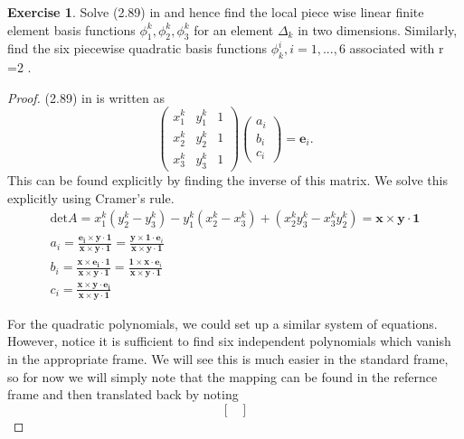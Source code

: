 \documentclass{amsart}
\theoremstyle{plain}
\theoremstyle{definition}
\newtheorem{exer}{Exercise}[section]
\begin{document}
\begin{exer}
    Solve (2.89) in \cite{lord2014introduction} and hence find the local piece wise linear finite element basis functions $\phi_1^k, \phi_2^k, \phi_3^k$ for an element $\Delta_k$ in two dimensions. Similarly, find the six piecewise quadratic basis functions $\phi_k^i, i = 1,...,6$ associated with r =2 .
\end{exer}
\begin{proof}
    (2.89) in \cite{lord2014introduction} is written as 
    $$\begin{pmatrix}
        x_1^k & y_1^k & 1 \\
        x_2^k & y_2^k & 1 \\
        x_3^k & y_3^k & 1
    \end{pmatrix}\begin{pmatrix}
        a_i\\
        b_i\\
        c_i
    \end{pmatrix} = \mathbf{e}_i.$$
    This can be found explicitly by finding the inverse of this matrix. We solve this explicitly using Cramer's rule. 
    \begin{gather*}
        \text{det}A = x_1^k\left(y_2^k - y_3^k\right)-y_1^k\left(x_2^k-x_3^k\right)+\left(x_2^k y_3^k - x_3^k y_2^k\right) = \mathbf{x}\times \mathbf{y}\cdot \mathbf{1}\\
        a_i = \frac{\mathbf{\mathbf{e}_i \times \mathbf{y}\cdot \mathbf{1}}}{\mathbf{x}\times \mathbf{y}\cdot \mathbf{1}} = \frac{\mathbf{\mathbf{y}\times \mathbf{1}} \cdot \mathbf{e}_i}{\mathbf{x}\times \mathbf{y}\cdot \mathbf{1}}\\
        b_i = \frac{\mathbf{\mathbf{x} \times \mathbf{e}_i\cdot \mathbf{1}}}{\mathbf{x}\times \mathbf{y}\cdot \mathbf{1}} = \frac{\mathbf{\mathbf{1}\times \mathbf{x}} \cdot \mathbf{e}_i}{\mathbf{x}\times \mathbf{y}\cdot \mathbf{1}}\\
        c_i = \frac{\mathbf{\mathbf{x} \times \mathbf{y}\cdot \mathbf{e}_i}}{\mathbf{x}\times \mathbf{y}\cdot \mathbf{1}} 
    \end{gather*}
    \par For the quadratic polynomials, we could set up a similar system of equations. However, notice it is sufficient to find six independent polynomials which vanish in the appropriate frame. We will see this is much easier in the standard frame, so for now we will simply note that the mapping can be found in the refernce frame and then translated back by noting
    $$\begin{bmatrix}

\end{bmatrix}$$
\end{proof}
\end{document}
